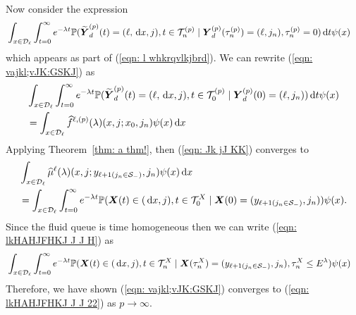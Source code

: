 Now consider the expression 
\begin{align}
	&\int_{x\in\mathcal{D}_\ell} \int_{t=0}^\infty e^{-\lambda t} \mathbb P(\widetilde{\boldsymbol Y}_d^{(p)}(t) = (\ell,\, \mathrm{d} x, j),  
	t\in\mathcal T_n^{(p)} \mid \boldsymbol Y_d^{(p)}(\tau_n^{(p)}) = (\ell, j_n),
	 	\tau_{n}^{(p)}= 0)\, \mathrm{d} t  \psi(x)  \label{eqn: vajkl;vJK:GSKJ}
\end{align}
which appears as part of (\ref{eqn: l whkrqvlkjbrd}). We can rewrite (\ref{eqn: vajkl;vJK:GSKJ}) as  
\begin{align}
	 &\int_{x\in\mathcal{D}_\ell} \int_{t=0}^\infty e^{-\lambda t} \mathbb P(\widetilde{\boldsymbol Y}_d^{(p)}(t) = (\ell,\, \mathrm{d} x,j), 
	t\in\mathcal T_0^{(p)}\mid \boldsymbol Y_d^{(p)}(0) = (\ell,j_n))\, \mathrm{d} t \psi(x) \nonumber 
	 \\&= \int_{x\in\mathcal{D}_\ell} \widehat f^{\ell,(p)} (\lambda)(x,j;x_0,j_n) \psi(x)\, \mathrm{d} x \label{eqn: Jk jJ KK}
\end{align}
Applying Theorem~\ref{thm: a thm!}, then (\ref{eqn: Jk jJ KK}) converges to 
\begin{align}
	&\int_{x\in\mathcal{D}_\ell} \widehat \mu^{\ell} (\lambda)(x,j;y_{\ell+1(j_n\in\mathcal S_-)},j_n) \psi(x)\, \mathrm{d} x \nonumber 
	\\&= \int_{x\in\mathcal{D}_\ell} \int_{t=0}^\infty e^{-\lambda t}\mathbb P(\boldsymbol X(t)\in(\, \mathrm{d} x, j), t\in\mathcal T_0^X \mid \boldsymbol X(0) = (y_{\ell+1(j_n\in\mathcal S_-)}, j_n) ) \psi(x). \label{eqn: lkHAHJFHKJ J J H}
\end{align}
Since the fluid queue is time homogeneous then we can write (\ref{eqn: lkHAHJFHKJ J J H}) as 
\begin{align}
	&\int_{x\in\mathcal{D}_\ell} \int_{t=0}^\infty e^{-\lambda t} \mathbb P(\boldsymbol X(t)\in(\, \mathrm{d} x,j), t\in\mathcal T_n^{X} \mid  
	\boldsymbol X(\tau_n^X) = (y_{\ell+1(j_n\in\mathcal S_-)},j_n), \tau_n^X\leq E^\lambda ) \psi(x)  \label{eqn: lkHAHJFHKJ J J 22}
\end{align}
Therefore, we have shown (\ref{eqn: vajkl;vJK:GSKJ}) converges to (\ref{eqn: lkHAHJFHKJ J J 22}) as \(p\to\infty\). 

